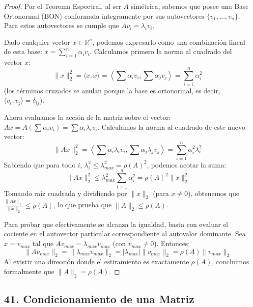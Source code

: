 \documentclass[12pt]{article}
\begin{document}
\begin{proof}
Por el Teorema Espectral, al ser $A$ simétrica, sabemos que posee una Base Ortonormal (BON) conformada íntegramente por sus autovectores $\{v_1, \dots, v_n\}$. Para estos autovectores se cumple que $Av_i = \lambda_i v_i$.

Dado cualquier vector $x \in \mathbb{R}^n$, podemos expresarlo como una combinación lineal de esta base: $x = \sum_{i=1}^n \alpha_i v_i$. 
Calculamos primero la norma al cuadrado del vector $x$:
\begin{equation}
    \|x\|_2^2 = \langle x, x \rangle = \left\langle \sum \alpha_i v_i, \sum \alpha_j v_j \right\rangle = \sum_{i=1}^n \alpha_i^2
\end{equation}
(los términos cruzados se anulan porque la base es ortonormal, es decir, $\langle v_i, v_j \rangle = \delta_{ij}$).

Ahora evaluamos la acción de la matriz sobre el vector: $Ax = A(\sum \alpha_i v_i) = \sum \alpha_i \lambda_i v_i$. 
Calculamos la norma al cuadrado de este nuevo vector:
\begin{equation}
    \|Ax\|_2^2 = \left\langle \sum \alpha_i \lambda_i v_i, \sum \alpha_j \lambda_j v_j \right\rangle = \sum_{i=1}^n \alpha_i^2 \lambda_i^2
\end{equation}
Sabiendo que para todo $i$, $\lambda_i^2 \le \lambda_{max}^2 = \rho(A)^2$, podemos acotar la suma:
\begin{equation}
    \|Ax\|_2^2 \le \lambda_{max}^2 \sum_{i=1}^n \alpha_i^2 = \rho(A)^2 \|x\|_2^2
\end{equation}
Tomando raíz cuadrada y dividiendo por $\|x\|_2$ (para $x \ne 0$), obtenemos que $\frac{\|Ax\|_2}{\|x\|_2} \le \rho(A)$, lo que prueba que $\|A\|_2 \le \rho(A)$.

Para probar que efectivamente se alcanza la igualdad, basta con evaluar el cociente en el autovector particular correspondiente al autovalor dominante. Sea $x = v_{max}$ tal que $A v_{max} = \lambda_{max} v_{max}$ (con $v_{max} \ne 0$). Entonces:
\begin{equation}
    \|A v_{max}\|_2 = \|\lambda_{max} v_{max}\|_2 = |\lambda_{max}| \|v_{max}\|_2 = \rho(A) \|v_{max}\|_2
\end{equation}
Al existir una dirección donde el estiramiento es exactamente $\rho(A)$, concluimos formalmente que $\|A\|_2 = \rho(A)$.
\end{proof}
\subsection*{41. Condicionamiento de una Matriz}
\end{document}

